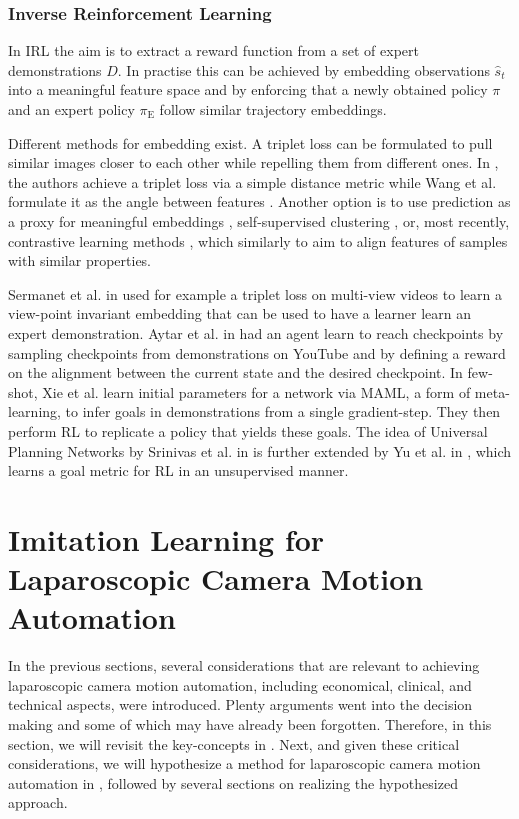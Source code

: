 \subsubsection{Inverse Reinforcement Learning}
In IRL the aim is to extract a reward function from a set of expert demonstrations $D$. In practise this can be achieved by embedding observations $\hat{s}_t$ into a meaningful feature space and by enforcing that a newly obtained policy $\pi$ and an expert policy $\pi_\text{E}$ follow similar trajectory embeddings.

Different methods for embedding exist. A triplet loss can be formulated to pull similar images closer to each other while repelling them from different ones. In \cite{wang2014learning, schroff2015facenet}, the authors achieve a triplet loss via a simple distance metric while Wang et al. formulate it as the angle between features \cite{wang2015unsupervised}. Another option is to use prediction as a proxy for meaningful embeddings \cite{vondrick2016anticipating, sermanet2016unsupervised, srivastava2015unsupervised, mathieu2015deep}, self-supervised clustering \cite{caron2018deep}, or, most recently, contrastive learning methods \cite{khosla2020supervised}, which similarly to \cite{wang2015unsupervised} aim to align features of samples with similar properties.

Sermanet et al. in \cite{sermanet2018time} used for example a triplet loss on multi-view videos to learn a view-point invariant embedding that can be used to have a learner learn an expert demonstration. Aytar et al. in \cite{aytar2018playing} had an agent learn to reach checkpoints by sampling checkpoints from demonstrations on YouTube and by defining a reward on the alignment between the current state and the desired checkpoint. In few-shot, Xie et al. \cite{xie2018few} learn initial parameters for a network via MAML, a form of meta-learning, to infer goals in demonstrations from a single gradient-step. They then perform RL to replicate a policy that yields these goals. The idea of Universal Planning Networks by Srinivas et al. in \cite{srinivas2018universal} is further extended by Yu et al. in \cite{yu2019unsupervised}, which learns a goal metric for RL in an unsupervised manner.

\section{Imitation Learning for Laparoscopic Camera Motion Automation}
\label{in:sec:imitation_learning_for_camera_motion_automation}
In the previous sections, several considerations that are relevant to achieving laparoscopic camera motion automation, including economical, clinical, and technical aspects, were introduced. Plenty arguments went into the decision making and some of which may have already been forgotten. Therefore, in this section, we will revisit the key-concepts in . Next, and given these critical considerations, we will hypothesize a method for laparoscopic camera motion automation in , followed by several sections on realizing the hypothesized approach.


